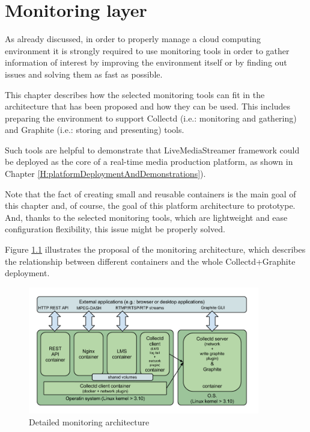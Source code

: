 \chapter{Monitoring layer}\label{G:monitoringLayer}

As already discussed, in order to properly manage a cloud computing environment it is strongly required to use monitoring tools in order to gather information of interest by improving the environment itself or by finding out issues and solving them as fast as possible.

This chapter describes how the selected monitoring tools can fit in the architecture that has been proposed and how they can be used. This includes preparing the environment to support Collectd (i.e.: monitoring and gathering) and Graphite (i.e.: storing and presenting) tools.

Such tools are helpful to demonstrate that LiveMediaStreamer framework could be deployed as the core of a real-time media production platform, as shown in Chapter \ref{H:platformDeploymentAndDemonstrations}).

Note that the fact of creating small and reusable containers is the main goal of this chapter and, of course, the goal of this platform architecture to prototype. And, thanks to the selected monitoring tools, which are lightweight and ease configuration flexibility, this issue might be properly solved.

Figure \ref{F:maex} illustrates the proposal of the monitoring architecture, which describes the relationship between different containers and the whole Collectd+Graphite deployment.

\begin{figure}[htb]
\begin{center}
\includegraphics[width=0.9\textwidth]{./images/monitArchProp.png}
\caption{Detailed monitoring architecture}
\label{F:maex}
\end{center}
\end{figure}


